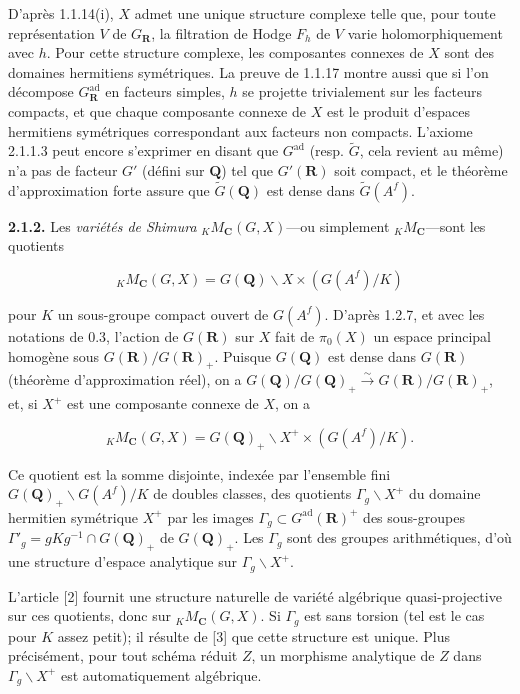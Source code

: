 \documentclass[10pt,a4paper]{article}
\newcommand{\SourcePage}[2]{\clearpage\setcounter{page}{#2}\typeout{D031_SOURCE_PAGE physical=#1 printed=#2}}
\begin{document}
D'après 1.1.14(i), \(X\) admet une unique structure complexe telle que, pour toute représentation \(V\) de \(G_{\mathbf R}\), la filtration de Hodge \(F_h\) de \(V\) varie holomorphiquement avec \(h\). Pour cette structure complexe, les composantes connexes de \(X\) sont des domaines hermitiens symétriques. La preuve de 1.1.17 montre aussi que si l'on décompose \(G_{\mathbf R}^{\mathrm{ad}}\) en facteurs simples, \(h\) se projette trivialement sur les facteurs compacts, et que chaque composante connexe de \(X\) est le produit d'espaces hermitiens symétriques correspondant aux facteurs non compacts. L'axiome 2.1.1.3 peut encore s'exprimer en disant que \(G^{\mathrm{ad}}\) (resp. \(\widetilde G\), cela revient au même) n'a pas de facteur \(G'\) (défini sur \(\mathbf Q\)) tel que \(G'(\mathbf R)\) soit compact, et le théorème d'approximation forte assure que \(\widetilde G(\mathbf Q)\) est dense dans \(\widetilde G(A^f)\).

\textbf{2.1.2.} Les \emph{variétés de Shimura} \({}_K M_{\mathbf C}(G,X)\)---ou simplement \({}_K M_{\mathbf C}\)---sont les quotients

\[
{}_K M_{\mathbf C}(G,X)=G(\mathbf Q)\backslash X\times(G(A^f)/K)
\]

pour \(K\) un sous-groupe compact ouvert de \(G(A^f)\). D'après 1.2.7, et avec les notations de 0.3, l'action de \(G(\mathbf R)\) sur \(X\) fait de \(\pi_0(X)\) un espace principal homogène sous \(G(\mathbf R)/G(\mathbf R)_+\). Puisque \(G(\mathbf Q)\) est dense dans \(G(\mathbf R)\) (théorème d'approximation réel), on a \(G(\mathbf Q)/G(\mathbf Q)_+\xrightarrow{\sim}G(\mathbf R)/G(\mathbf R)_+\), et, si \(X^+\) est une composante connexe de \(X\), on a

\[
{}_K M_{\mathbf C}(G,X)=G(\mathbf Q)_+\backslash X^+\times(G(A^f)/K).
\]

Ce quotient est la somme disjointe, indexée par l'ensemble fini \(G(\mathbf Q)_+\backslash G(A^f)/K\) de doubles classes, des quotients \(\Gamma_g\backslash X^+\) du domaine hermitien symétrique \(X^+\) par les images \(\Gamma_g\subset G^{\mathrm{ad}}(\mathbf R)^+\) des sous-groupes \(\Gamma'_g=gKg^{-1}\cap G(\mathbf Q)_+\) de \(G(\mathbf Q)_+\). Les \(\Gamma_g\) sont des groupes arithmétiques, d'où une structure d'espace analytique sur \(\Gamma_g\backslash X^+\).

\SourcePage{20}{266}
L'article {[}2{]} fournit une structure naturelle de variété algébrique quasi-projective sur ces quotients, donc sur \({}_K M_{\mathbf C}(G,X)\). Si \(\Gamma_g\) est sans torsion (tel est le cas pour \(K\) assez petit); il résulte de {[}3{]} que cette structure est unique. Plus précisément, pour tout schéma réduit \(Z\), un morphisme analytique de \(Z\) dans \(\Gamma_g\backslash X^+\) est automatiquement algébrique.
\end{document}
